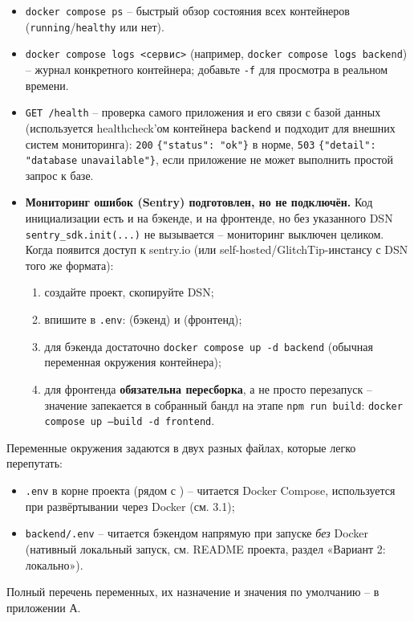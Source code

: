 \begin{itemize}
  \item \texttt{docker compose ps} -- быстрый обзор состояния всех
        контейнеров (\texttt{running}/\texttt{healthy} или нет).
  \item \texttt{docker compose logs <сервис>} (например,
        \texttt{docker compose logs backend}) -- журнал конкретного
        контейнера; добавьте \texttt{-f} для просмотра в реальном
        времени.
  \item \texttt{GET /health} -- проверка самого приложения и его связи с
        базой данных (используется healthcheck'ом контейнера
        \texttt{backend} и подходит для внешних систем мониторинга):
        \texttt{200} \texttt{\{"status": "ok"\}} в норме,
        \texttt{503} \texttt{\{"detail":} \texttt{"database} \texttt{unavailable"\}}, если
        приложение не может выполнить простой запрос к базе.
  \item \textbf{Мониторинг ошибок (Sentry) подготовлен, но не
        подключён.} Код инициализации есть и на бэкенде, и на
        фронтенде, но без указанного DSN \texttt{sentry\_sdk.init(...)}
        не вызывается -- мониторинг выключен целиком. Когда появится
        доступ к sentry.io (или self-hosted/GlitchTip-инстансу с DSN
        того же формата):
        \begin{enumerate}
          \item создайте проект, скопируйте DSN;
          \item впишите в \texttt{.env}: 
                (бэкенд) и  (фронтенд);
          \item для бэкенда достаточно
                \texttt{docker compose up -d backend} (обычная
                переменная окружения контейнера);
          \item для фронтенда \textbf{обязательна пересборка}, а не
                просто перезапуск -- значение запекается в собранный
                бандл на этапе \texttt{npm run build}:
                \texttt{docker compose up --build -d frontend}.
        \end{enumerate}
\end{itemize}


Переменные окружения задаются в двух разных файлах, которые легко
перепутать:
\begin{itemize}
  \item \texttt{.env} в корне проекта (рядом с
        ) -- читается Docker Compose,
        используется при развёртывании через Docker (см. 3.1);
  \item \texttt{backend/.env} -- читается бэкендом напрямую при запуске
        \emph{без} Docker (нативный локальный запуск, см. README проекта,
        раздел «Вариант 2: локально»).
\end{itemize}
Полный перечень переменных, их назначение и значения по умолчанию -- в
приложении А.

